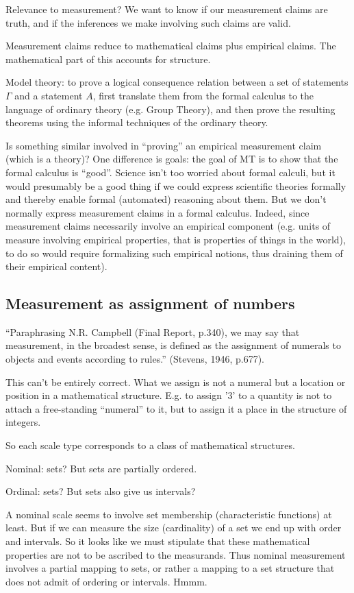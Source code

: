 \documentclass[11pt,twoside]{article}
\begin{document}
Relevance to measurement?  We want to know if our measurement claims
are truth, and if the inferences we make involving such claims are
valid.

Measurement claims reduce to mathematical claims plus empirical
claims.  The mathematical part of this accounts for structure.

Model theory: to prove a logical consequence relation between a set of
statements $\Gamma$ and a statement $A$, first translate them from the
formal calculus to the language of ordinary theory (e.g. Group
Theory), and then prove the resulting theorems using the informal
techniques of the ordinary theory.

Is something similar involved in ``proving'' an empirical measurement
claim (which is a theory)?  One difference is goals: the goal of MT is
to show that the formal calculus is ``good''.  Science isn't too
worried about formal calculi, but it would presumably be a good thing
if we could express scientific theories formally and thereby enable
formal (automated) reasoning about them.  But we don't normally
express measurement claims in a formal calculus.  Indeed, since
measurement claims necessarily involve an empirical component
(e.g. units of measure involving empirical properties, that is
properties of things in the world), to do so would require formalizing
such empirical notions, thus draining them of their empirical
content).

\subsection{Measurement as assignment of numbers}

``Paraphrasing N.R. Campbell (Final Report, p.340), we may say that
measurement, in the broadest sense, is defined as the assignment of
numerals to objects and events according to rules.'' (Stevens, 1946,
p.677).

This can't be entirely correct.  What we assign is not a numeral but a
location or position in a mathematical structure.  E.g. to assign '3'
to a quantity is not to attach a free-standing ``numeral'' to it, but
to assign it a place in the structure of integers.

So each scale type corresponds to a class of mathematical structures.

Nominal:  sets?  But sets are partially ordered.

Ordinal:  sets?  But sets also give us intervals?

A nominal scale seems to involve set membership (characteristic
functions) at least.  But if we can measure the size (cardinality) of
a set we end up with order and intervals.  So it looks like we must
stipulate that these mathematical properties are not to be ascribed to
the measurands.  Thus nominal measurement involves a partial mapping
to sets, or rather a mapping to a set structure that does not admit of
ordering or intervals.  Hmmm.
\end{document}
